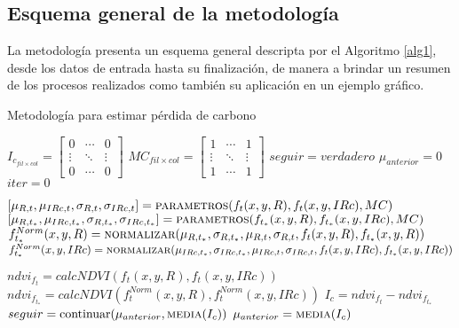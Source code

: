 \subsection{Esquema general de la metodolog\'ia}
La metodolog\'ia presenta un esquema general descripta por el Algoritmo \ref{alg1}, desde los datos de entrada hasta su finalizaci\'on, de manera a brindar un resumen de los procesos realizados como tambi\'en su aplicaci\'on en un ejemplo gr\'afico.
\begin{algorithm}
	\caption{Metodolog\'ia para estimar p\'erdida de carbono}
	\label{alg1}
	\begin{algorithmic}[1]
		\Statex
		\State $ I_{c_{fil \times col}}=  \begin{bmatrix}
		0 & \cdots & 0 \\
		\vdots & \ddots &  \vdots \\
		0 & \cdots & 0
		\end{bmatrix} $ 
		\State $ MC_{fil \times col} = \begin{bmatrix}
		1 & \cdots & 1 \\
		\vdots & \ddots &  \vdots \\
		1 & \cdots & 1
		\end{bmatrix} $ 
		\State $ seguir = verdadero $ 
		\State $\mu_{anterior} =0$ 
		\Statex
		\State $ iter = 0 $
		
			\State {}
			\State {}
			\State $[\mu_{R,t},\mu_{IRc,t},\sigma_{R,t},\sigma_{IRc,t}] = \textsc{parametros}(f_{t}(x,y,R),f_{t}(x,y,IRc),MC)$		
			\State $[\mu_{R,t_{*}},\mu_{IRc,t_{*}},\sigma_{R,t_{*}},\sigma_{IRc,t_{*}}] = \textsc{parametros}(f_{t_{*}}(x,y,R),f_{t_{*}}(x,y,IRc),MC)$
			\Statex
			\State {}
			\State $f_{t_{*}}^{Norm}(x,y,R) = \textsc{normalizar}(\mu_{R,t_{*}},\sigma_{R,t_{*}},\mu_{R,t},\sigma_{R,t},f_{t}(x,y,R),f_{t_{*}}(x,y,R))$  
			\State $f_{t_{*}}^{Norm}(x,y,IRc) = \textsc{normalizar}(\mu_{IRc,t_{*}},\sigma_{IRc,t_{*}},\mu_{IRc,t},\sigma_{IRc,t},f_{t}(x,y,IRc),f_{t_{*}}(x,y,IRc))$  
			
			\State {}
			\State $ndvi_{f_{t}}=calcNDVI(f_{t}(x,y,R),f_{t}(x,y,IRc))$
			\State $ndvi_{f_{t_{*}}}=calcNDVI(f_{t}^{Norm}(x,y,R),f_{t}^{Norm}(x,y,IRc))$
			\Statex
			\State {}
			\State $I_{c} = ndvi_{f_{t}} - ndvi_{f_{t_{*}}}$
			\State {}
			\State $seguir=\text{continuar}(\mu_{anterior},\textsc{media}(I_{c}))$
			\State $\mu_{anterior}=\textsc{media}(I_{c})$
			\Statex
			

\end{algorithmic}
\end{algorithm}
